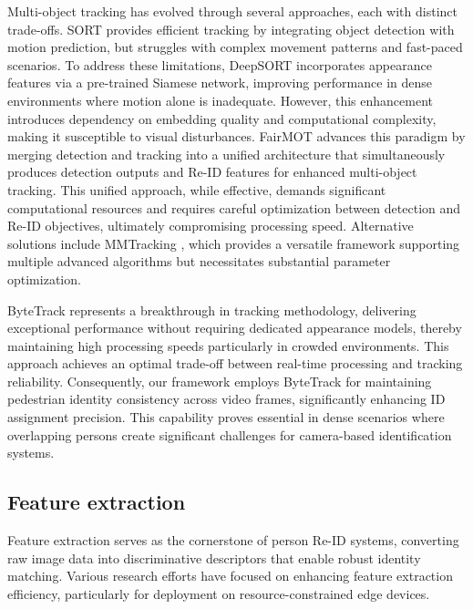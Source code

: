 \documentclass[../main.tex]{subfiles}
\begin{document}
Multi-object tracking has evolved through several approaches, each with distinct trade-offs. SORT \cite{sort} provides efficient tracking by integrating object detection with motion prediction, but struggles with complex movement patterns and fast-paced scenarios. To address these limitations, DeepSORT \cite{deepsort} incorporates appearance features via a pre-trained Siamese network, improving performance in dense environments where motion alone is inadequate. However, this enhancement introduces dependency on embedding quality and computational complexity, making it susceptible to visual disturbances. FairMOT \cite{fairmot} advances this paradigm by merging detection and tracking into a unified architecture that simultaneously produces detection outputs and Re-ID features for enhanced multi-object tracking. This unified approach, while effective, demands significant computational resources and requires careful optimization between detection and Re-ID objectives, ultimately compromising processing speed. Alternative solutions include MMTracking \cite{mmtracking}, which provides a versatile framework supporting multiple advanced algorithms but necessitates substantial parameter optimization.

ByteTrack \cite{bytetrack} represents a breakthrough in tracking methodology, delivering exceptional performance without requiring dedicated appearance models, thereby maintaining high processing speeds particularly in crowded environments. This approach achieves an optimal trade-off between real-time processing and tracking reliability. Consequently, our framework employs ByteTrack for maintaining pedestrian identity consistency across video frames, significantly enhancing ID assignment precision. This capability proves essential in dense scenarios where overlapping persons create significant challenges for camera-based identification systems.

\subsection{Feature extraction}
\label{sec:feature_extraction}

Feature extraction serves as the cornerstone of person Re-ID systems, converting raw image data into discriminative descriptors that enable robust identity matching. Various research efforts have focused on enhancing feature extraction efficiency, particularly for deployment on resource-constrained edge devices.
\end{document}
